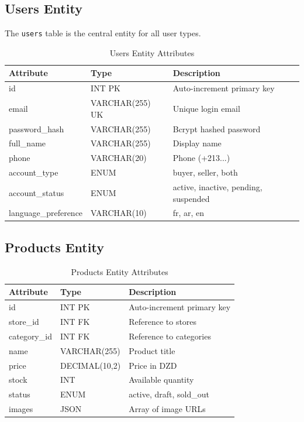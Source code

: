 \documentclass[12pt,a4paper]{report}
\begin{document}
\subsection{Users Entity}

The \texttt{users} table is the central entity for all user types.

\begin{table}[h]
\centering
\begin{tabular}{llp{6cm}}
\toprule
\textbf{Attribute} & \textbf{Type} & \textbf{Description} \\
\midrule
id & INT PK & Auto-increment primary key \\
email & VARCHAR(255) UK & Unique login email \\
password\_hash & VARCHAR(255) & Bcrypt hashed password \\
full\_name & VARCHAR(255) & Display name \\
phone & VARCHAR(20) & Phone (+213...) \\
account\_type & ENUM & buyer, seller, both \\
account\_status & ENUM & active, inactive, pending, suspended \\
language\_preference & VARCHAR(10) & fr, ar, en \\
\bottomrule
\end{tabular}
\caption{Users Entity Attributes}
\end{table}

\subsection{Products Entity}

\begin{table}[h]
\centering
\begin{tabular}{llp{6cm}}
\toprule
\textbf{Attribute} & \textbf{Type} & \textbf{Description} \\
\midrule
id & INT PK & Auto-increment primary key \\
store\_id & INT FK & Reference to stores \\
category\_id & INT FK & Reference to categories \\
name & VARCHAR(255) & Product title \\
price & DECIMAL(10,2) & Price in DZD \\
stock & INT & Available quantity \\
status & ENUM & active, draft, sold\_out \\
images & JSON & Array of image URLs \\
\bottomrule
\end{tabular}
\caption{Products Entity Attributes}
\end{table}
\end{document}

